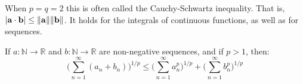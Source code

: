         When $p=q=2$ this is often
        called the Cauchy-Schwartz inequality.
        That is,
        $|\mathbf{a}\cdot\mathbf{b}|%
         \leq\norm{\mathbf{a}}\norm{\mathbf{b}}$.
        It holds for the integrals of continuous
        functions, as well as for sequences.
        \begin{theorem}
            If $a:\mathbb{N}\rightarrow\mathbb{R}$
            and $b:\mathbb{N}\rightarrow\mathbb{R}$ are
            non-negative sequences, and if $p>1$,
            then:
            \begin{equation*}
                \bigg(
                    \sum_{n=1}^{\infty}(a_{n}+b_{n})
                \bigg)^{1/p}
                \leq
                \bigg(
                    \sum_{n=1}^{\infty}a_{n}^{p}
                \bigg)^{1/p}
                +
                \bigg(
                    \sum_{n=1}^{\infty}b_{n}^{p}
                \bigg)^{1/p}
            \end{equation*}
        \end{theorem}